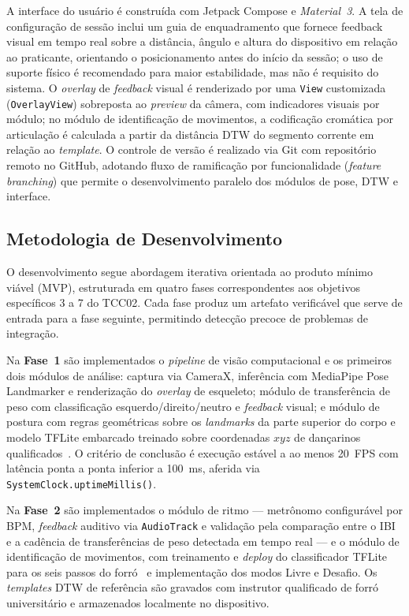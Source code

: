 A interface do usuário é construída com Jetpack Compose e \textit{Material~3}. A tela de
configuração de sessão inclui um guia de enquadramento que fornece feedback visual em tempo
real sobre a distância, ângulo e altura do dispositivo em relação ao praticante, orientando
o posicionamento antes do início da sessão; o uso de suporte físico é recomendado para
maior estabilidade, mas não é requisito do sistema. O \textit{overlay} de
\textit{feedback} visual é renderizado por uma \texttt{View} customizada
(\texttt{OverlayView}) sobreposta ao \textit{preview} da câmera, com indicadores visuais por módulo; no módulo de identificação de movimentos, a
codificação cromática por articulação é calculada a partir da distância DTW do
segmento corrente em relação ao \textit{template}. O controle de versão é realizado via Git com repositório remoto no GitHub,
adotando fluxo de ramificação por funcionalidade (\textit{feature branching}) que permite o
desenvolvimento paralelo dos módulos de pose, DTW e interface.

\subsection{Metodologia de Desenvolvimento}
\label{sub:metodologia}

O desenvolvimento segue abordagem iterativa orientada ao produto mínimo viável (MVP),
estruturada em quatro fases correspondentes aos objetivos específicos 3 a 7 do TCC02. Cada
fase produz um artefato verificável que serve de entrada para a fase seguinte, permitindo
detecção precoce de problemas de integração.

Na \textbf{Fase~1} são implementados o \textit{pipeline} de visão computacional e os
primeiros dois módulos de análise: captura via CameraX, inferência com MediaPipe Pose
Landmarker e renderização do \textit{overlay} de esqueleto; módulo de transferência de peso
com classificação esquerdo/direito/neutro e \textit{feedback} visual; e módulo de postura
com regras geométricas sobre os \textit{landmarks} da parte superior do corpo e modelo TFLite
embarcado treinado sobre coordenadas $xyz$ de dançarinos qualificados~\cite{roggio2024pose}. O critério de
conclusão é execução estável a ao menos 20~FPS com latência ponta a ponta inferior a 100~ms,
aferida via \texttt{SystemClock.uptimeMillis()}.

Na \textbf{Fase~2} são implementados o módulo de ritmo --- metrônomo configurável por BPM,
\textit{feedback} auditivo via \texttt{AudioTrack} e validação pela comparação entre o IBI
e a cadência de transferências de peso detectada em tempo real --- e o módulo de identificação
de movimentos, com treinamento e \textit{deploy} do classificador TFLite para os seis passos
do forró~\cite{skeleton_dtw_sport} e implementação dos modos Livre e Desafio. Os
\textit{templates} DTW de referência são gravados com instrutor qualificado de forró
universitário e armazenados localmente no dispositivo.

